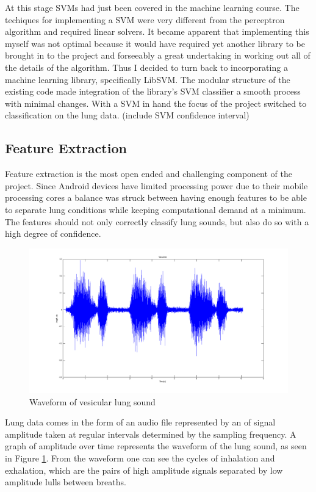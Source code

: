 \documentclass{article}
\begin{document}
 At this stage SVMs had just been covered in the machine learning course. The techiques for implementing a SVM were very different from the perceptron algorithm and required linear solvers. It became apparent that implementing this myself was not optimal because it would have required yet another library to be brought in to the project and forseeably a great undertaking in working out all of the details of the algorithm. Thus I decided to turn back to incorporating a machine learning library, specifically LibSVM. The modular structure of the existing code made integration of the library’s SVM classifier a smooth process with minimal changes. With a SVM in hand the focus of the project switched to classification on the lung data. (include SVM confidence interval)

\subsection{Feature Extraction}

Feature extraction is the most open ended and challenging  component of the project. Since Android devices have limited processing power due to their mobile processing cores a balance was struck between having enough features to be able to separate lung conditions while keeping computational demand at a minimum. The features should not only correctly classify lung sounds, but also do so with a high degree of confidence. \\

\begin{figure}[h!]
	\includegraphics[width=\linewidth]{images/VesicularWaveform.png}
	\caption{Waveform of vesicular lung sound}
 	\label{fig:VesicularWaveform}
\end{figure}

Lung data comes in the form of an audio file represented by an of signal amplitude taken at regular intervals determined by the sampling frequency. A graph of amplitude over time represents the waveform of the lung sound, as seen in Figure \ref{fig:VesicularWaveform}. From the waveform one can see the cycles of inhalation and exhalation, which are the pairs of high amplitude signals separated by low amplitude lulls between breaths. \\
\end{document}
